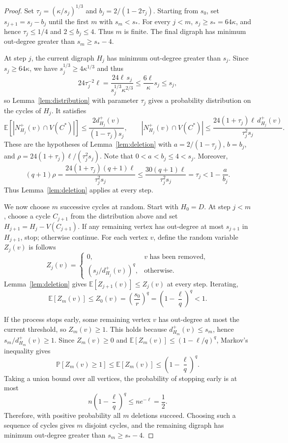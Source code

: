 \documentclass[a4paper,12pt]{article}
\numberwithin{equation}{section}
\newcommand{\jbjcomment}[1]{\textcolor{blue}{JBJ: #1}}
\begin{document}
\begin{proof}
Set $\tau_j=(\kappa/s_j)^{1/3}$ and $b_j=2/(1-2\tau_j)$.
Starting from $s_0$, set $s_{j+1}=s_j-b_j$ until the first $m$ with
$s_m<s_\ast$. For every $j<m$, $s_j\ge s_\ast=64\kappa$, and hence
$\tau_j\le1/4$ and $2\le b_j\le4$. Thus $m$ is finite. The final digraph
has minimum out-degree greater than $s_m\ge s_\ast-4$.

At step $j$, the current digraph $H_j$ has minimum out-degree greater than
$s_j$. Since $s_j\ge64\kappa$, we have $s_j^{1/3}\ge4\kappa^{1/3}$ and
thus
$$
24\tau_j^{-2}\ell
=\frac{24\ell\,s_j}{s_j^{1/3}\kappa^{2/3}}
\le\frac{6\ell}{\kappa}s_j\le s_j,
$$
so Lemma~\ref{lem:distribution} with parameter $\tau_j$ gives a probability distribution on the cycles of $H_j$. It satisfies
$$
\mathbb E[|N_{H_j}^+(v)\cap V(C^\ast)|]
\le\frac{2d_{H_j}^+(v)}{(1-\tau_j)s_j},
\qquad
|N_{H_j}^+(v)\cap V(C^\ast)|
\le\frac{24(1+\tau_j)\ell\,d_{H_j}^+(v)}{\tau_j^2s_j}.
$$
These are the hypotheses of Lemma~\ref{lem:deletion} with
$a=2/(1-\tau_j)$, $b=b_j$, and
$\rho=24(1+\tau_j)\ell/(\tau_j^2s_j)$. Note that
$0<a<b_j\le4<s_j$. Moreover,
$$
(q+1)\rho =\frac{24(1+\tau_j)(q+1)\ell}{\tau_j^2s_j}\le\frac{30(q+1)\ell}{\tau_j^2s_j}=\tau_j
<1-\frac{a}{b_j}.
$$
Thus Lemma~\ref{lem:deletion} applies at every step.



We now choose $m$ successive cycles at random. Start with $H_0=D$. At
step $j<m$, choose a cycle $C_{j+1}$ from the distribution above and set
$H_{j+1}=H_j-V(C_{j+1})$. If any remaining vertex has out-degree at most
$s_{j+1}$ in $H_{j+1}$, stop; otherwise continue.
For each vertex $v$, define the random variable $Z_j(v)$ is follows 
$$
Z_j(v)=
\begin{cases}
0,&v\text{ has been removed},\\
(s_j/d_{H_j}^+(v))^q,&\text{otherwise}.
\end{cases}
$$
Lemma~\ref{lem:deletion} gives $\mathbb E[Z_{j+1}(v)]\le Z_j(v)$ at
every step. Iterating,
$$
\mathbb E[Z_m(v)]\le Z_0(v)=\left(\frac{s_0}{r}\right)^q
=\left(1-\frac{\ell}{q}\right)^q<1.
$$

If the process stops early, some remaining vertex $v$ has out-degree at
most the current threshold, so $Z_m(v)\ge1$.  This holds because $d_{H_m}^+(v)\le s_m$, hence $s_m/d_{H_m}^+(v)\ge1$.  Since $Z_m(v)\ge0$ and
$\mathbb E[Z_m(v)]\le(1-\ell/q)^q$, Markov's inequality gives
$$
\mathbb P[Z_m(v)\ge1]\le\mathbb E[Z_m(v)]\le\left(1-\frac{\ell}{q}\right)^q.
$$
Taking a union bound over all vertices, the probability of stopping early
is at most
$$
n\left(1-\frac{\ell}{q}\right)^q\le ne^{-\ell}=\frac12.
$$
Therefore, with positive probability all $m$ deletions succeed. Choosing
such a sequence of cycles gives $m$ disjoint cycles, and the remaining
digraph has minimum out-degree greater than $s_m\ge s_\ast-4$.


\end{proof}
\end{document}
